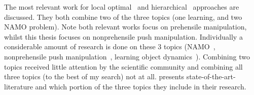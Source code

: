The most relevant work for local optimal~\cite{sabbaghnovin_model_2021} and hierarchical~\cite{scholz_navigation_2016} approaches are discussed. They both combine two of the three topics (one learning, and two \ac{NAMO} problem). Note both relevant works focus on prehensile manipulation, whilst this thesis focuses on nonprehensile push manipulation. Individually a considerable amount of research is done on these 3 topics (\ac{NAMO}~\cite{chen_fast_2018,elbanhawi_samplingbased_2014,ellis_navigation_2022,kingston_samplingbased_2018,lavalle_planning_2006,wang_affordancebased_2020}, nonprehensile push manipulation~\cite{arruda_uncertainty_2017,bauza_dataefficient_2018,mericli_pushmanipulation_2015,stuber_featurebased_2018,stuber_let_2020,toussaint_sequenceofconstraints_2022}, learning object dynamics~\cite{cong_selfadapting_2020,seegmiller_vehicle_2013}).
Combining two topics received little attention by the scientific community and combining all three topics (to the best of my search) not at all.  presents state-of-the-art-literature and which portion of the three topics they include in their research.\bs



